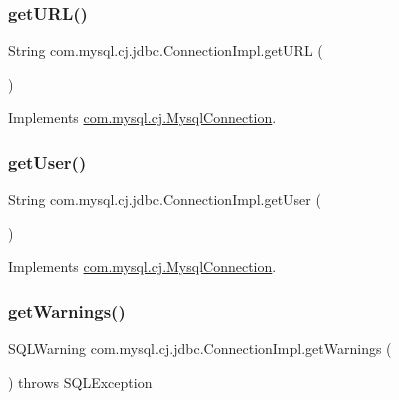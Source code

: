 \subsubsection{\texorpdfstring{get\+U\+R\+L()}{getURL()}}
{\footnotesize\ttfamily String com.\+mysql.\+cj.\+jdbc.\+Connection\+Impl.\+get\+U\+RL (\begin{DoxyParamCaption}{ }\end{DoxyParamCaption})}



Implements \mbox{\hyperlink{interfacecom_1_1mysql_1_1cj_1_1_mysql_connection_a8fab6ed57d7f54fbd017890355b610a2}{com.\+mysql.\+cj.\+Mysql\+Connection}}.

\mbox{\label{classcom_1_1mysql_1_1cj_1_1jdbc_1_1_connection_impl_afbb744e880f00dfaf434498ab5cbceba}} 
\subsubsection{\texorpdfstring{get\+User()}{getUser()}}
{\footnotesize\ttfamily String com.\+mysql.\+cj.\+jdbc.\+Connection\+Impl.\+get\+User (\begin{DoxyParamCaption}{ }\end{DoxyParamCaption})}



Implements \mbox{\hyperlink{interfacecom_1_1mysql_1_1cj_1_1_mysql_connection_adc3ee83d060d0d48cb92e181dc5cbbb6}{com.\+mysql.\+cj.\+Mysql\+Connection}}.

\mbox{\label{classcom_1_1mysql_1_1cj_1_1jdbc_1_1_connection_impl_a960584f75700b7d6f8418590e4474b03}} 
\subsubsection{\texorpdfstring{get\+Warnings()}{getWarnings()}}
{\footnotesize\ttfamily S\+Q\+L\+Warning com.\+mysql.\+cj.\+jdbc.\+Connection\+Impl.\+get\+Warnings (\begin{DoxyParamCaption}{ }\end{DoxyParamCaption}) throws S\+Q\+L\+Exception}

